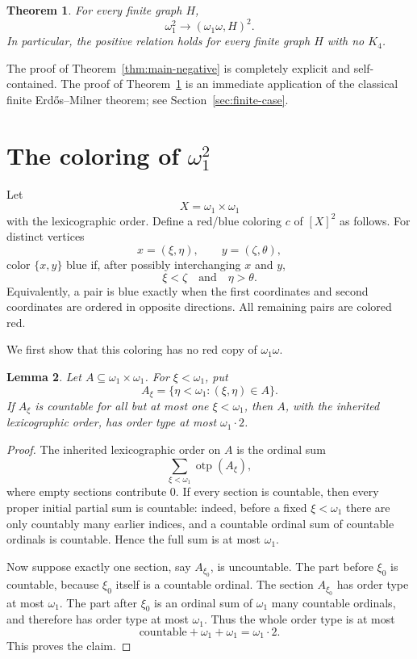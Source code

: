 \documentclass[11pt,a4paper]{amsart}
\newtheorem{theorem}{Theorem}[section]
\newtheorem{lemma}[theorem]{Lemma}
\theoremstyle{definition}
\newcommand{\otp}{\operatorname{otp}}
\begin{document}
\begin{theorem}\label{thm:finite-case}
For every finite graph $H$,
\[
        \omega_1^2\to(\omega_1\omega,H)^2.
\]
In particular, the positive relation holds for every finite graph $H$ with no $K_4$.
\end{theorem}

The proof of Theorem~\ref{thm:main-negative} is completely explicit and self-contained.  The proof of Theorem~\ref{thm:finite-case} is an immediate application of the classical finite Erd\H{o}s--Milner theorem; see Section~\ref{sec:finite-case}.

\section{The coloring of $\omega_1^2$}

Let
\[
        X=\omega_1\times\omega_1
\]
with the lexicographic order.  Define a red/blue coloring $c$ of $[X]^2$ as follows.  For distinct vertices
\[
        x=(\xi,\eta),\qquad y=(\zeta,\theta),
\]
color $\{x,y\}$ blue if, after possibly interchanging $x$ and $y$,
\[
        \xi<\zeta\quad\text{and}\quad \eta>\theta.
\]
Equivalently, a pair is blue exactly when the first coordinates and second coordinates are ordered in opposite directions.  All remaining pairs are colored red.

We first show that this coloring has no red copy of $\omega_1\omega$.

\begin{lemma}\label{lem:sections-small-order-type}
Let $A\subseteq\omega_1\times\omega_1$.  For $\xi<\omega_1$, put
\[
        A_\xi=\{\eta<\omega_1:(\xi,\eta)\in A\}.
\]
If $A_\xi$ is countable for all but at most one $\xi<\omega_1$, then $A$, with the inherited lexicographic order, has order type at most $\omega_1\cdot2$.
\end{lemma}

\begin{proof}
The inherited lexicographic order on $A$ is the ordinal sum
\[
        \sum_{\xi<\omega_1}\otp(A_\xi),
\]
where empty sections contribute $0$.  If every section is countable, then every proper initial partial sum is countable: indeed, before a fixed $\xi<\omega_1$ there are only countably many earlier indices, and a countable ordinal sum of countable ordinals is countable.  Hence the full sum is at most $\omega_1$.

Now suppose exactly one section, say $A_{\xi_0}$, is uncountable.  The part before $\xi_0$ is countable, because $\xi_0$ itself is a countable ordinal.  The section $A_{\xi_0}$ has order type at most $\omega_1$.  The part after $\xi_0$ is an ordinal sum of $\omega_1$ many countable ordinals, and therefore has order type at most $\omega_1$.  Thus the whole order type is at most
\[
        \text{countable}+\omega_1+\omega_1=\omega_1\cdot2.
\]
This proves the claim.
\end{proof}
\end{document}

